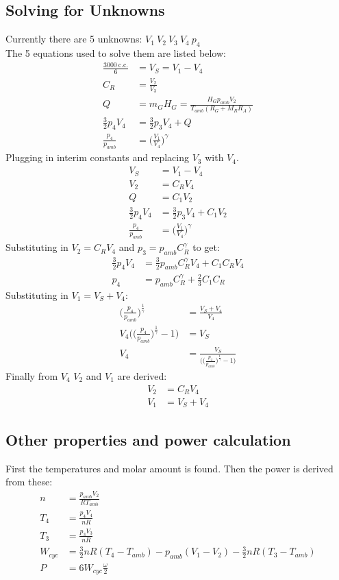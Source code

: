 \documentclass[10pt,a4paper]{article}
\begin{document}
	\subsection*{Solving for Unknowns}
	Currently there are 5 unknowns: $V_1\ V_2\ V_3\ V_4\ p_4$ \\
	The 5 equations used to solve them are listed below:
	\begin{align}
	\frac{3000\ \text{c.c.}}{6} &= V_S = V_1-V_4\\	
	C_R &= \frac{V_2}{V_3} \\
	Q &= m_G H_G = \frac{H_G p_{amb} V_2}{T_{amb}(R_G + M_R R_A)} \\
	\frac{3}{2} p_4 V_4 &= \frac{3}{2} p_3 V_4 + Q \\
	\frac{p_4}{p_{amb}} &= \Big( \frac{V_1}{V_4} \Big)^{\gamma}	
	\end{align}
	Plugging in interim constants and replacing $V_3$ with $V_4$.
	\begin{align}
	V_S &= V_1-V_4\\	
	V_2 &= C_R V_4 \\
	Q &= C_1 V_2 \\
	\frac{3}{2} p_4 V_4 &= \frac{3}{2} p_3 V_4 + C_1 V_2 \\
	\frac{p_4}{p_{amb}} &= \Big( \frac{V_1}{V_4} \Big)^{\gamma}	
	\end{align}
	Substituting in $V_2 = C_R V_4$ and $p_3 = p_{amb} C_R^{\gamma}$ to get:
	\begin{align}
		\frac{3}{2} p_4 V_4 &= \frac{3}{2} p_{amb} C_R^{\gamma} V_4 + C_1 C_R V_4 \\
		p_4 &= p_{amb} C_R^{\gamma} + \frac{2}{3} C_1 C_R
	\end{align}
	Substituting in $V_1 = V_S + V_4$:
	\begin{align}
		\Big( \frac{p_4}{p_{amb}} \Big)^{\frac{1}{\gamma}} &= \frac{V_S + V_4}{V_4}\\
		V_4 \bigg( \Big( \frac{p_4}{p_{amb}} \Big)^{\frac{1}{\gamma}} - 1 \bigg) &= V_S \\
		V_4 &= \frac{V_S}{\Bigg( \Big( \frac{p_4}{p_{amb}} \Big)^{\frac{1}{\gamma}} - 1 \Bigg)}
	\end{align}
	Finally from $V_4$ $V_2$ and $V_1$ are derived:
	\begin{align}
		V_2 &= C_R V_4 \\
		V_1 &= V_S + V_4
	\end{align}
	\subsection{Other properties and power calculation}
	First the temperatures and molar amount is found. Then the power is derived from these:
	\begin{align}
		n &= \frac{p_{amb} V_2}{R T_{amb}}\\
		T_4 &= \frac{p_4 V_4}{n R}\\
		T_3 &= \frac{p_3 V_3}{n R}\\
		W_{cyc} &= \frac{3}{2}n R (T_4-T_{amb}) - p_{amb}(V_1-V_2) - \frac{3}{2}n R (T_3-T_{amb})\\
		P &= 6 W_{cyc} \frac{\omega}{2}
	\end{align}
\end{document}
